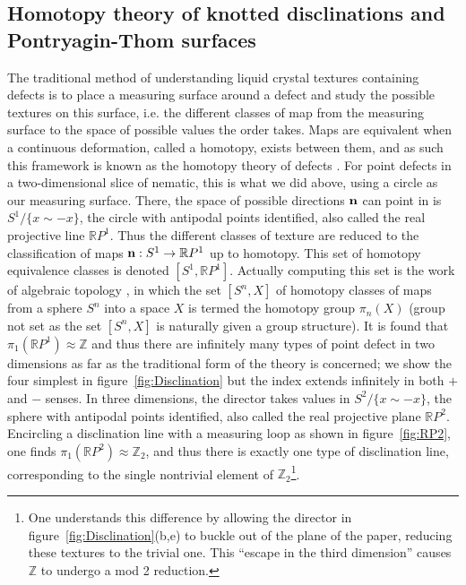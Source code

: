\subsection{Homotopy theory of knotted disclinations and Pontryagin-Thom surfaces}
The traditional method of understanding liquid crystal textures containing defects is to place a measuring surface around a defect and study the possible textures on this surface, i.e. the different classes of map from the measuring surface to the space of possible values the order takes. Maps are equivalent when a continuous deformation, called a homotopy, exists between them, and as such this framework is known as the homotopy theory of defects \citep{Mermin1979,Alexander2012}. For point defects in a two-dimensional slice of nematic, this is what we did above, using a circle as our measuring surface. There, the space of possible directions $\bf n$ can point in is $S^1/\{x\sim-x\}$, the circle with antipodal points identified, also called the real projective line $\mathbb{R}P^1$. Thus the different classes of texture are reduced to the classification of maps ${\bf n}:S^1 \rightarrow \mathbb{R}P^1$ up to homotopy. This set of homotopy equivalence classes is denoted $[S^1,\mathbb{R}P^1]$. Actually computing this set is the work of algebraic topology \citep{Hatcher2012}, in which the set  $[S^n,X]$ of homotopy classes of maps from a sphere $S^n$ into a space $X$  is termed the homotopy group $\pi_n(X)$ (group not set as the set $[S^n,X]$ is naturally given a group structure). It is found that $\pi_1(\mathbb{R}P^1) \approx \mathbb{Z}$ and thus there are infinitely many types of point defect in two dimensions as far as the traditional form of the theory is concerned; we show the four simplest in figure~\ref{fig:Disclination} but the index extends infinitely in both $+$ and $-$ senses. In three dimensions, the director takes values in $S^2/\{x\sim-x\}$, the sphere with antipodal points identified, also called the real projective plane $\mathbb{R}P^2$. Encircling a disclination line with a measuring loop as shown in figure~\ref{fig:RP2}, one finds $\pi_1(\mathbb{R}P^2) \approx \mathbb{Z}_2$, and thus there is exactly one type of disclination line, corresponding to the single nontrivial element of $\mathbb{Z}_2$\footnote{ One understands this difference by allowing the director in figure~\ref{fig:Disclination}(b,e) to buckle out of the plane of the paper, reducing these textures to the trivial one. This ``escape in the third dimension'' causes $\mathbb{Z}$ to undergo a mod 2 reduction.}.
